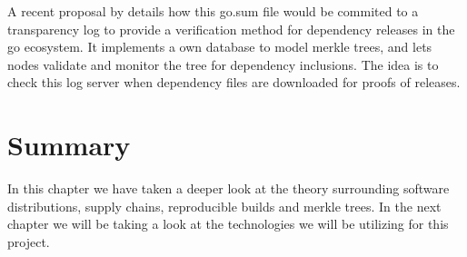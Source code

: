 \documentclass[../Main/thesis.tex]{subfiles}
\begin{document}
A recent proposal by \citeauthor{russ-cos-and-filippo-valsorda} details how this
go.sum file would be commited to a transparency log to provide a verification
method for dependency releases in the go ecosystem. It implements a own database
to model merkle trees, and lets nodes validate and monitor the tree for
dependency inclusions. The idea is to check this log server when dependency
files are downloaded for proofs of releases.\cite{russ-cos-and-filippo-valsorda}


\section*{Summary}\label{sec:summary-theory} 
In this chapter we have taken a deeper look at the theory surrounding software
distributions, supply chains, reproducible builds and merkle trees. In the next
chapter we will be taking a look at the technologies we will be utilizing for
this project.
\blankpage
\end{document}
